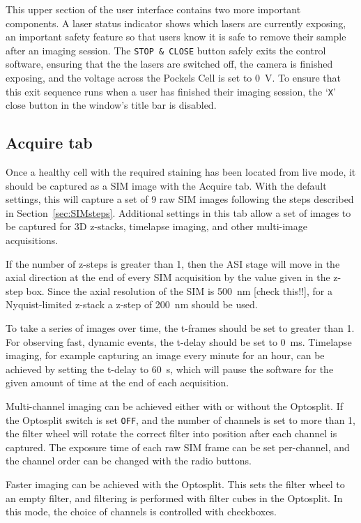 This upper section of the user interface contains two more important components. 
A laser status indicator shows which lasers are currently exposing, an important safety feature so that users know it is safe to remove their sample after an imaging session. 
The \texttt{STOP \& CLOSE} button safely exits the control software, ensuring that the the lasers are switched off, the camera is finished exposing, and the voltage across the Pockels Cell is set to \SI{0}{\volt}. 
To ensure that this exit sequence runs when a user has finished their imaging session, the `\texttt{X}' close button in the window's title bar is disabled. 

\subsection{Acquire tab}
Once a healthy cell with the required staining has been located from live mode, it should be captured as a SIM image with the Acquire tab. 
With the default settings, this will capture a set of 9 raw SIM images following the steps described in Section~\ref{sec:SIMsteps}.
Additional settings in this tab allow a set of images to be captured for 3D z-stacks, timelapse imaging, and other multi-image acquisitions. 

If the number of z-steps is greater than 1, then the ASI stage will move in the axial direction at the end of every SIM acquisition by the value given in the z-step box. 
Since the axial resolution of the SIM is \SI{500}{\nano\meter} [check this!!], for a Nyquist-limited z-stack a z-step of \SI{200}{\nano\meter} should be used. 

To take a series of images over time, the t-frames should be set to greater than 1.
For observing fast, dynamic events, the t-delay should be set to \SI{0}{\milli\second}. 
Timelapse imaging, for example capturing an image every minute for an hour, can be achieved by setting the t-delay to \SI{60}{\second}, which will pause the software for the given amount of time at the end of each acquisition. 

Multi-channel imaging can be achieved either with or without the Optosplit. 
If the Optosplit switch is set \texttt{OFF}, and the number of channels is set to more than 1, the filter wheel will rotate the correct filter into position after each channel is captured. 
The exposure time of each raw SIM frame can be set per-channel, and the channel order can be changed with the radio buttons. 

Faster imaging can be achieved with the Optosplit. 
This sets the filter wheel to an empty filter, and filtering is performed with filter cubes in the Optosplit. 
In this mode, the choice of channels is controlled with checkboxes. 

